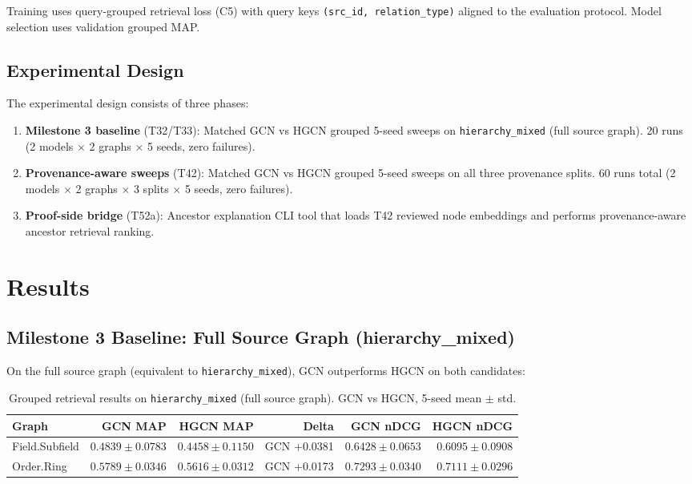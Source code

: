 \documentclass[runningheads]{llncs}
\begin{document}
Training uses query-grouped retrieval loss (C5) with query keys \texttt{(src\_id, relation\_type)} aligned to the evaluation protocol. Model selection uses validation grouped MAP.

\subsection{Experimental Design}

The experimental design consists of three phases:

\begin{enumerate}
\item \textbf{Milestone 3 baseline} (T32/T33): Matched GCN vs HGCN grouped 5-seed sweeps on \texttt{hierarchy\_mixed} (full source graph). 20 runs (2 models $\times$ 2 graphs $\times$ 5 seeds, zero failures).
\item \textbf{Provenance-aware sweeps} (T42): Matched GCN vs HGCN grouped 5-seed sweeps on all three provenance splits. 60 runs total (2 models $\times$ 2 graphs $\times$ 3 splits $\times$ 5 seeds, zero failures).
\item \textbf{Proof-side bridge} (T52a): Ancestor explanation CLI tool that loads T42 reviewed node embeddings and performs provenance-aware ancestor retrieval ranking.
\end{enumerate}

\section{Results}

\subsection{Milestone 3 Baseline: Full Source Graph (hierarchy\_mixed)}

On the full source graph (equivalent to \texttt{hierarchy\_mixed}), GCN outperforms HGCN on both candidates:

\begin{table}[h]
\centering
\caption{Grouped retrieval results on \texttt{hierarchy\_mixed} (full source graph). GCN vs HGCN, 5-seed mean $\pm$ std.}
\label{tab:baseline}
\begin{tabular}{lrrrrr}
\toprule
Graph & GCN MAP & HGCN MAP & Delta & GCN nDCG & HGCN nDCG \\
\midrule
Field.Subfield & $0.4839 \pm 0.0783$ & $0.4458 \pm 0.1150$ & GCN +0.0381 & $0.6428 \pm 0.0653$ & $0.6095 \pm 0.0908$ \\
Order.Ring     & $0.5789 \pm 0.0346$ & $0.5616 \pm 0.0312$ & GCN +0.0173 & $0.7293 \pm 0.0340$ & $0.7111 \pm 0.0296$ \\
\bottomrule
\end{tabular}
\end{table}
\end{document}
